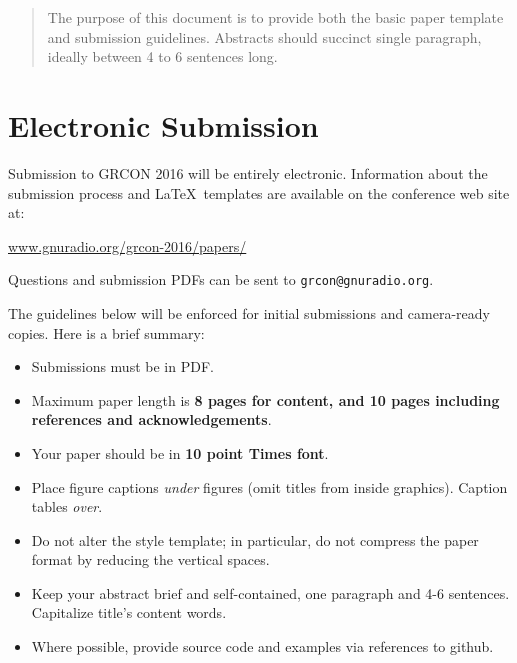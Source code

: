 \documentclass{article}
\begin{document}
 


\vskip 0.3in

\begin{abstract} 
The purpose of this document is to provide both the basic paper template and submission guidelines. 
Abstracts should succinct single paragraph, ideally between 4 to 6 sentences long.
\end{abstract} 

\section{Electronic Submission}
\label{submission}

Submission to GRCON 2016 will be entirely electronic.  
Information about the submission process and \LaTeX\ templates
are available on the conference web site at:

\begin{center}
\url{www.gnuradio.org/grcon-2016/papers/}
\end{center}

Questions and submission PDFs can be sent to 
\texttt{grcon@gnuradio.org}.

The guidelines below will be enforced for initial submissions and
camera-ready copies.  Here is a brief summary:
\begin{itemize}
\item Submissions must be in PDF.
\item Maximum paper length is \textbf{8 pages for content, and 10 pages including references and acknowledgements}.
\item Your paper should be in \textbf{10 point Times font}.
\item Place figure captions {\em under} figures (omit titles from inside graphics).  Caption tables {\em over}.
\item Do not alter the style template; in particular, do not compress the paper format by reducing the vertical spaces.
\item Keep your abstract brief and self-contained, one paragraph and 4-6 sentences.  Capitalize title's content words.
\item Where possible, provide source code and examples via references to github.
\end{itemize}
\end{document}
